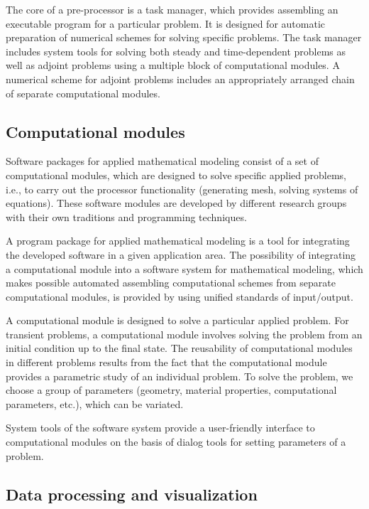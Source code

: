 \documentclass{elsarticle}
\begin{document}
The core of a pre-processor is a task manager, which provides assembling an executable program for a particular problem.
It is designed for automatic preparation of numerical schemes for solving specific problems.
The task manager includes system tools for solving both steady and time-dependent problems
as well as adjoint problems using a multiple block of computational modules.
A numerical scheme for adjoint problems includes an appropriately arranged chain of separate computational modules.

\subsection{Computational modules}

Software packages for applied mathematical modeling consist of a set of computational modules,
which are designed to solve specific applied problems, i.e., to carry out the processor functionality
(generating mesh, solving systems of equations). 
These software modules are developed by different research groups with their own traditions and programming techniques.

A program package for applied mathematical modeling is a tool for integrating the developed software
in a given application area. The possibility of integrating a computational module into a software system
for mathematical modeling, which makes possible automated assembling computational schemes from separate 
computational modules, is provided by using unified standards of input/output.

A computational module is designed to solve a particular applied problem.
For transient problems, a computational module involves solving the problem from an initial condition up to the final state.
The reusability of computational modules in different problems results from the fact that the computational module
provides a parametric study of an individual problem. 
To solve the problem, we choose a group of parameters (geometry, material properties, computational parameters, etc.),
which can be variated.

System tools of the software system provide a user-friendly interface to computational modules on the basis 
of dialog tools for setting parameters of a problem.

\subsection{Data processing and visualization}
\end{document}
